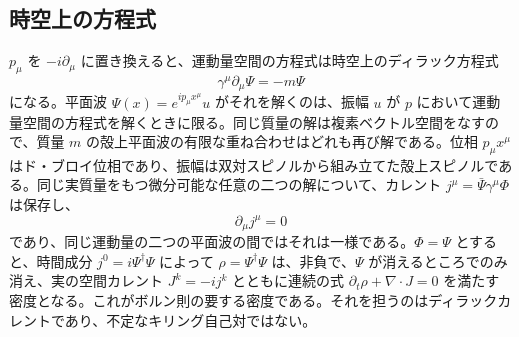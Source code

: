 \documentclass[a4paper]{article}
\begin{document}
\subsection{時空上の方程式}

$p_\mu$ を $-i\partial_\mu$ に置き換えると、運動量空間の方程式は時空上のディラック方程式
\[
\gamma^\mu\partial_\mu\Psi=-m\Psi
\]
になる。平面波 $\Psi(x)=e^{ip_\mu x^\mu}u$ がそれを解くのは、振幅 $u$ が $p$ において運動量空間の方程式を解くときに限る。同じ質量の解は複素ベクトル空間をなすので、質量 $m$ の殻上平面波の有限な重ね合わせはどれも再び解である。位相 $p_\mu x^\mu$ はド・ブロイ位相であり、振幅は双対スピノルから組み立てた殻上スピノルである。同じ実質量をもつ微分可能な任意の二つの解について、カレント $j^\mu=\bar\Psi\gamma^\mu\Phi$ は保存し、
\[
\partial_\mu j^\mu=0
\]
であり、同じ運動量の二つの平面波の間ではそれは一様である。$\Phi=\Psi$ とすると、時間成分 $j^0=i\Psi^\dagger\Psi$ によって $\rho=\Psi^\dagger\Psi$ は、非負で、$\Psi$ が消えるところでのみ消え、実の空間カレント $J^k=-ij^k$ とともに連続の式 $\partial_t\rho+\nabla\cdot J=0$ を満たす密度となる。これがボルン則の要する密度である。それを担うのはディラックカレントであり、不定なキリング自己対ではない。
\end{document}
